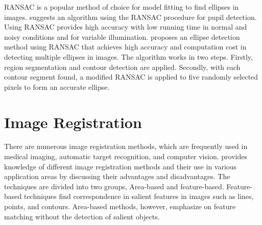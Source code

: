 \noindent RANSAC is a popular method of choice for model fitting to find ellipses in images. \cite{Bozomitu} suggests an algorithm using the RANSAC procedure for pupil detection. Using RANSAC provides high accuracy with low running time in normal and noisy conditions and for variable illumination. \cite{Xie} proposes an ellipse detection method using RANSAC that achieves high accuracy and computation cost in detecting multiple ellipses in images. The algorithm works in two steps. Firstly, region segmentation and contour detection are applied. Secondly, with each contour segment found, a modified RANSAC is applied to five randomly selected pixels to form an accurate ellipse.

\section{Image Registration}
There are numerous image registration methods, which are frequently used in medical imaging, automatic target recognition, and computer vision. \cite{Saxena} provides knowledge of different image registration methods and their use in various application areas by discussing their advantages and disadvantages. The techniques are divided into two groups, Area-based and feature-based. Feature-based techniques find correspondence in salient features in images such as lines, points, and contours. Area-based methods, however, emphasize on feature matching without the detection of salient objects.  \\


